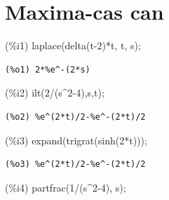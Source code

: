 \documentclass[
  letterpaper,
  DIV=11,
  numbers=noendperiod]{scrreprt}
\newenvironment{Shaded}{\begin{snugshade}}{\end{snugshade}}
\newcommand{\ConstantTok}[1]{\textcolor[rgb]{0.56,0.35,0.01}{#1}}
\newcommand{\DecValTok}[1]{\textcolor[rgb]{0.68,0.00,0.00}{#1}}
\newcommand{\FunctionTok}[1]{\textcolor[rgb]{0.28,0.35,0.67}{#1}}
\newcommand{\NormalTok}[1]{\textcolor[rgb]{0.00,0.23,0.31}{#1}}
\theoremstyle{plain}
\theoremstyle{remark}
\begin{document}
\section{Maxima-cas can}\label{maxima-cas-can}

\begin{Shaded}
\begin{Highlighting}[]
\NormalTok{(\%}\ConstantTok{i1}\NormalTok{) }\FunctionTok{laplace}\NormalTok{(}\FunctionTok{delta}\NormalTok{(}\ConstantTok{t}\DecValTok{{-}2}\NormalTok{)*}\ConstantTok{t}\NormalTok{, }\ConstantTok{t}\NormalTok{, }\ConstantTok{s}\NormalTok{);}
\end{Highlighting}
\end{Shaded}

\begin{verbatim}
(%o1) 2*%e^-(2*s)
\end{verbatim}

\begin{Shaded}
\begin{Highlighting}[]
\NormalTok{(\%}\ConstantTok{i2}\NormalTok{) }\FunctionTok{ilt}\NormalTok{(}\DecValTok{2}\NormalTok{/(}\ConstantTok{s}\NormalTok{\^{}}\DecValTok{2{-}4}\NormalTok{),}\ConstantTok{s}\NormalTok{,}\ConstantTok{t}\NormalTok{);}
\end{Highlighting}
\end{Shaded}

\begin{verbatim}
(%o2) %e^(2*t)/2-%e^-(2*t)/2
\end{verbatim}

\begin{Shaded}
\begin{Highlighting}[]
\NormalTok{(\%}\ConstantTok{i3}\NormalTok{) }\FunctionTok{expand}\NormalTok{(}\FunctionTok{trigrat}\NormalTok{(}\FunctionTok{sinh}\NormalTok{(}\DecValTok{2}\NormalTok{*}\ConstantTok{t}\NormalTok{)));}
\end{Highlighting}
\end{Shaded}

\begin{verbatim}
(%o3) %e^(2*t)/2-%e^-(2*t)/2
\end{verbatim}

\begin{Shaded}
\begin{Highlighting}[]
\NormalTok{(\%}\ConstantTok{i4}\NormalTok{) }\FunctionTok{partfrac}\NormalTok{(}\DecValTok{1}\NormalTok{/(}\ConstantTok{s}\NormalTok{\^{}}\DecValTok{2{-}4}\NormalTok{), }\ConstantTok{s}\NormalTok{);}
\end{Highlighting}
\end{Shaded}
\end{document}

